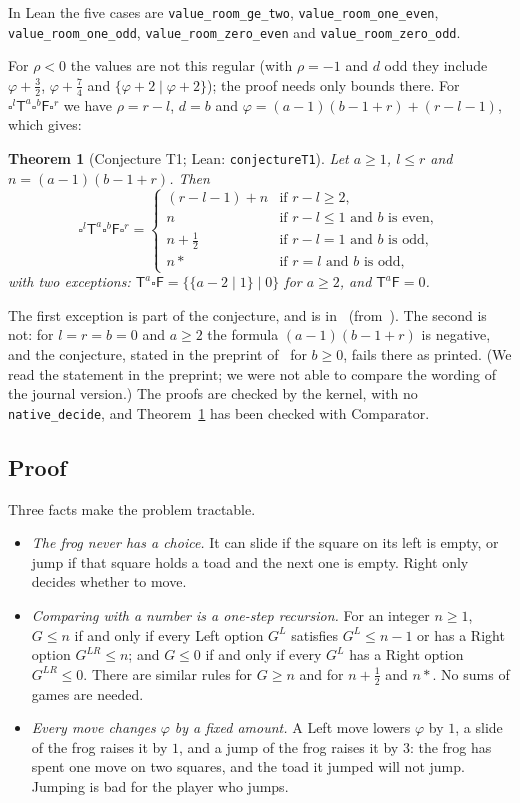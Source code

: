 \documentclass[11pt,a4paper]{article}
\newcommand{\Tt}{\mathsf{T}}
\newcommand{\Ff}{\mathsf{F}}
\newcommand{\E}{\square}
\newcommand{\lean}[1]{\texttt{#1}}
\theoremstyle{plain}
\newtheorem{theorem}{Theorem}
\theoremstyle{remark}
\begin{document}
{\raggedright In Lean the five cases are \lean{value\_room\_ge\_two}, \lean{value\_room\_one\_even},
\lean{value\_room\_one\_odd}, \lean{value\_room\_zero\_even} and
\lean{value\_room\_zero\_odd}.\par}

For $\rho<0$ the values are not this regular (with $\rho=-1$ and $d$ odd they include
$\varphi+\frac32$, $\varphi+\frac74$ and $\{\varphi+2\mid\varphi+2\}$); the proof needs only bounds
there. For $\E^l\Tt^a\E^b\Ff\E^r$ we have $\rho=r-l$, $d=b$ and
$\varphi=(a-1)(b-1+r)+(r-l-1)$, which gives:

\begin{theorem}[Conjecture T1; Lean: \lean{conjectureT1}]\label{thm:T1}
Let $a\ge1$, $l\le r$ and $n=(a-1)(b-1+r)$. Then
\[
\E^l\Tt^a\E^b\Ff\E^r=
\begin{cases}
(r-l-1)+n & \text{if } r-l\ge2,\\
n & \text{if } r-l\le1 \text{ and } b \text{ is even},\\
n+\tfrac12 & \text{if } r-l=1 \text{ and } b \text{ is odd},\\
n\ast & \text{if } r=l \text{ and } b \text{ is odd},
\end{cases}
\]
with two exceptions: $\Tt^a\E\Ff=\{\{a-2\mid1\}\mid0\}$ for $a\ge2$, and $\Tt^a\Ff=0$.
\end{theorem}

The first exception is part of the conjecture, and is in~\cite{E96} (from~\cite{WW}). The second
is not: for $l=r=b=0$ and $a\ge2$ the
formula $(a-1)(b-1+r)$ is negative, and the conjecture, stated in the preprint of~\cite{T11} for
$b\ge0$, fails there as printed. (We read the statement in the preprint; we were not able to
compare the wording of the journal version.) The proofs are checked by the kernel, with no
\lean{native\_decide}, and Theorem~\ref{thm:T1} has been checked with Comparator.

\subsection{Proof}

Three facts make the problem tractable.
\begin{itemize}
\item \emph{The frog never has a choice.} It can slide if the square on its left is empty, or
  jump if that square holds a toad and the next one is empty. Right only decides whether to move.
\item \emph{Comparing with a number is a one-step recursion.} For an integer $n\ge1$, $G\le n$
  if and only if every Left option $G^L$ satisfies $G^L\le n-1$ or has a Right option
  $G^{LR}\le n$; and $G\le 0$ if and only if every $G^L$ has a Right option $G^{LR}\le0$. There
  are similar rules for $G\ge n$ and for $n+\frac12$ and $n\ast$. No sums of games are needed.
\item \emph{Every move changes $\varphi$ by a fixed amount.} A Left move lowers $\varphi$ by $1$,
  a slide of the frog raises it by $1$, and a jump of the frog raises it by $3$: the frog has
  spent one move on two squares, and the toad it jumped will not jump. Jumping is bad for the
  player who jumps.
\end{itemize}
\end{document}
